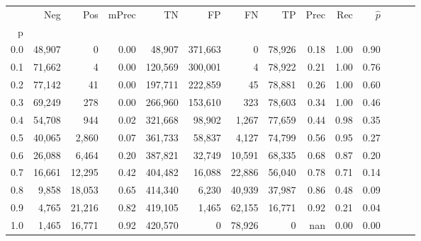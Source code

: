 \begin{tabular}{rrrrrrrrrrrrrr}
\toprule
{} &     Neg &     Pos & mPrec &       TN &       FP &      FN &      TP &  Prec &   Rec & $\hat{p}$ \\
p   &         &         &       &          &          &         &         &       &       &           \\
\midrule
0.0 &  48,907 &       0 &  0.00 &   48,907 &  371,663 &       0 &  78,926 &  0.18 &  1.00 &      0.90 \\
0.1 &  71,662 &       4 &  0.00 &  120,569 &  300,001 &       4 &  78,922 &  0.21 &  1.00 &      0.76 \\
0.2 &  77,142 &      41 &  0.00 &  197,711 &  222,859 &      45 &  78,881 &  0.26 &  1.00 &      0.60 \\
0.3 &  69,249 &     278 &  0.00 &  266,960 &  153,610 &     323 &  78,603 &  0.34 &  1.00 &      0.46 \\
0.4 &  54,708 &     944 &  0.02 &  321,668 &   98,902 &   1,267 &  77,659 &  0.44 &  0.98 &      0.35 \\
0.5 &  40,065 &   2,860 &  0.07 &  361,733 &   58,837 &   4,127 &  74,799 &  0.56 &  0.95 &      0.27 \\
0.6 &  26,088 &   6,464 &  0.20 &  387,821 &   32,749 &  10,591 &  68,335 &  0.68 &  0.87 &      0.20 \\
0.7 &  16,661 &  12,295 &  0.42 &  404,482 &   16,088 &  22,886 &  56,040 &  0.78 &  0.71 &      0.14 \\
0.8 &   9,858 &  18,053 &  0.65 &  414,340 &    6,230 &  40,939 &  37,987 &  0.86 &  0.48 &      0.09 \\
0.9 &   4,765 &  21,216 &  0.82 &  419,105 &    1,465 &  62,155 &  16,771 &  0.92 &  0.21 &      0.04 \\
1.0 &   1,465 &  16,771 &  0.92 &  420,570 &        0 &  78,926 &       0 &   nan &  0.00 &      0.00 \\
\bottomrule
\end{tabular}
